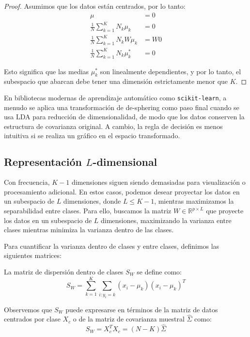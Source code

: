 \begin{proof}
Asumimos que los datos están centrados, por lo tanto:
\begin{align*}
\mu &= 0 \\
\frac{1}{N} \sum_{k=1}^K N_k \mu_k &= 0 \\
\frac{1}{N} \sum_{k=1}^K N_k W\mu_k &= W0 \\
\frac{1}{N} \sum_{k=1}^K N_k \mu_k^* & = 0
\end{align*}

Esto significa que las medias $\mu_k^*$ son linealmente dependientes, y por lo tanto, el subespacio que abarcan debe tener una dimensión estrictamente menor que $K$.
\end{proof}

En bibliotecas modernas de aprendizaje automático como \texttt{scikit-learn}, a menudo se aplica una transformación de de-sphering como paso final cuando se usa LDA para reducción de dimensionalidad, de modo que los datos conserven la estructura de covarianza original. A cambio, la regla de decisión es menos intuitiva si se realiza un gráfico en el espacio transformado.

\subsection{Representación $L$-dimensional}

Con frecuencia, $K-1$ dimensiones siguen siendo demasiadas para visualización o procesamiento adicional. En estos casos, podemos desear proyectar los datos en un subespacio de $L$ dimensiones, donde $L \leq K-1$, mientras maximizamos la separabilidad entre clases. Para ello, buscamos la matriz $W \in \mathbb{R}^{p \times L}$ que proyecte los datos en un subespacio de $L$ dimensiones, maximizando la varianza entre clases mientras minimiza la varianza dentro de las clases.

Para cuantificar la varianza dentro de clases y entre clases, definimos las siguientes matrices:

\begin{definition}
La matriz de dispersión dentro de clases $S_W$ se define como:
\[
S_W = \sum_{k=1}^K \sum_{i: y_i = k} (x_i - \mu_k)(x_i - \mu_k)^T
\]
\end{definition}

Observemos que $S_W$ puede expresarse en términos de la matriz de datos centrados por clase $X_c$ o de la matriz de covarianza muestral $\hat{\Sigma}$ como:
\[
S_W = X_c^T X_c = (N - K) \hat{\Sigma}
\]

